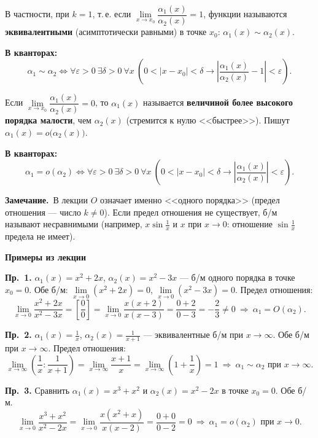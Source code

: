 \documentclass[a4paper,11pt]{article}
\newcommand{\eps}{\varepsilon}
\newcommand{\kv}{\par\noindent\textbf{\textcolor{oprc!85!black}{В кванторах:}}}
\newcommand{\zam}{\par\smallskip\noindent\textbf{\textcolor{zamc}{Замечание.}}\ }
\newcommand{\podr}[1]{\par\needspace{8\baselineskip}\medskip
  {\large\bfseries\textcolor{oprc!80!black}{#1}}\par\nopagebreak\smallskip}
\begin{document}
\begin{opr}
В частности, при $k = 1$, т.\,е. если $\lim\limits_{x \to x_0} \dfrac{\alpha_1(x)}{\alpha_2(x)} = 1$, функции называются
\textbf{эквивалентными} (асимптотически равными) в точке $x_0$: $\alpha_1(x) \sim \alpha_2(x)$.
\kv
\[
  \alpha_1 \sim \alpha_2 \Leftrightarrow \forall \eps > 0\ \exists \delta > 0\ \forall x\
  \left( 0 < |x - x_0| < \delta \to \left|\frac{\alpha_1(x)}{\alpha_2(x)} - 1\right| < \eps \right).
\]
\end{opr}

\begin{opr}
Если $\lim\limits_{x \to x_0} \dfrac{\alpha_1(x)}{\alpha_2(x)} = 0$, то $\alpha_1(x)$ называется \textbf{величиной более высокого порядка малости},
чем $\alpha_2(x)$ (стремится к нулю <<быстрее>>). Пишут $\alpha_1(x) = o\bigl(\alpha_2(x)\bigr)$.
\kv
\[
  \alpha_1 = o(\alpha_2) \Leftrightarrow \forall \eps > 0\ \exists \delta > 0\ \forall x\
  \left( 0 < |x - x_0| < \delta \to \left|\frac{\alpha_1(x)}{\alpha_2(x)}\right| < \eps \right).
\]
\end{opr}

\zam В лекции $O$ означает именно <<одного порядка>> (предел отношения --- число $k \ne 0$). Если предел отношения не существует,
б/м называют несравнимыми (например, $x \sin\frac1x$ и $x$ при $x \to 0$: отношение $\sin\frac1x$ предела не имеет).

\podr{Примеры из лекции}

\textbf{Пр.~1.} $\alpha_1(x) = x^2 + 2x$, $\alpha_2(x) = x^2 - 3x$ --- б/м одного порядка в точке $x_0 = 0$.
Обе б/м: $\lim\limits_{x \to 0} (x^2 + 2x) = 0$, $\lim\limits_{x \to 0} (x^2 - 3x) = 0$. Предел отношения:
\[
  \lim_{x \to 0} \frac{x^2 + 2x}{x^2 - 3x}
  = \left[\frac{0}{0}\right]
  = \lim_{x \to 0} \frac{x(x + 2)}{x(x - 3)}
  = \frac{0 + 2}{0 - 3} = -\frac{2}{3} \ne 0
  \ \Longrightarrow\ \alpha_1 = O(\alpha_2).
\]

\textbf{Пр.~2.} $\alpha_1(x) = \frac{1}{x}$, $\alpha_2(x) = \frac{1}{x + 1}$ --- эквивалентные б/м при $x \to \infty$.
Обе б/м при $x \to \infty$. Предел отношения:
\[
  \lim_{x \to \infty} \left(\frac{1}{x} : \frac{1}{x + 1}\right)
  = \lim_{x \to \infty} \frac{x + 1}{x}
  = \lim_{x \to \infty} \left(1 + \frac{1}{x}\right) = 1
  \ \Longrightarrow\ \alpha_1 \sim \alpha_2 \text{ при } x \to \infty.
\]

\textbf{Пр.~3.} Сравнить $\alpha_1(x) = x^3 + x^2$ и $\alpha_2(x) = x^2 - 2x$ в точке $x_0 = 0$. Обе б/м.
\[
  \lim_{x \to 0} \frac{x^3 + x^2}{x^2 - 2x}
  = \lim_{x \to 0} \frac{x(x^2 + x)}{x(x - 2)}
  = \frac{0 + 0}{0 - 2} = 0
  \ \Longrightarrow\ \alpha_1 = o(\alpha_2) \text{ при } x \to 0.
\]
\end{document}
